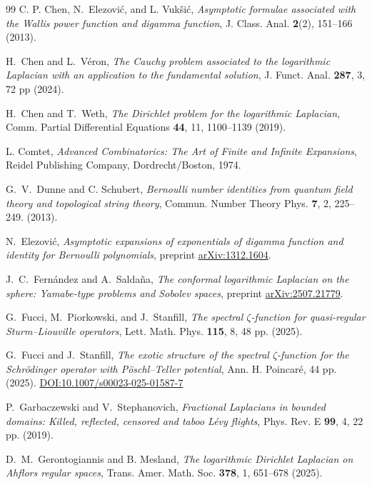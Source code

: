 \documentclass[letterpaper,10pt]{amsart}
\newcommand{\arxiv}[1]{\href{http://arxiv.org/abs/#1}{arXiv:#1}}
\newcommand{\doi}[1]{\href{http://dx.doi.org/#1}{DOI:#1}}
\numberwithin{equation}{section}
\begin{document}
\begin{thebibliography}{99}
 C. P. Chen, N.\ Elezovi\'{c}, and L. Vuk\v{s}i\'{c}, \textit{Asymptotic formulae associated with the Wallis power function and digamma function}, J. Class. Anal. \textbf{2}(2), 151--166 (2013).

 H.\ Chen and L.\ Véron, \textit{The Cauchy problem associated to the logarithmic Laplacian with an application to the fundamental solution}, J. Funct. Anal. {\bf 287}, 3, 72 pp (2024).

 H.\ Chen and T.\ Weth, \textit{The Dirichlet problem for the logarithmic Laplacian}, Comm. Partial Differential Equations {\bf 44}, 11,  1100--1139 (2019).

 L. Comtet, \textit{Advanced Combinatorics: The Art of Finite and Infinite Expansions}, Reidel Publishing Company, Dordrecht/Boston, 1974.

 G.\ V.\ Dunne and C. Schubert, \textit{Bernoulli number identities from quantum field theory and topological string theory}, Commun. Number Theory Phys. {\bf 7}, 2, 225--249. (2013). 

 N.\ Elezovi\'{c}, \textit{Asymptotic expansions of exponentials of digamma function and identity for Bernoulli polynomials}, preprint \arxiv{1312.1604}.

 J.\ C.\ Fernández and A.\ Saldaña, {\it The conformal logarithmic Laplacian on the sphere:
Yamabe-type problems and Sobolev spaces}, preprint \arxiv{2507.21779}.

 G.\ Fucci,  M.\ Piorkowski, and J.\ Stanfill, {\it The spectral $\zeta$-function for quasi-regular Sturm--Liouville operators}, Lett. Math. Phys. {\bf 115}, 8, 48 pp. (2025).

 G.\ Fucci and J.\ Stanfill, \textit{The exotic structure of the spectral $\zeta$-function for the Schr\"odinger operator with P\"oschl--Teller potential}, Ann. H. Poincar\'e, 44 pp. (2025). \doi{10.1007/s00023-025-01587-7}

 P.\ Garbaczewski and V.\ Stephanovich, \textit{Fractional Laplacians in bounded domains: Killed, reflected, censored and taboo Lévy
flights}, Phys. Rev. E {\bf 99}, 4, 22 pp. (2019).

 D.\ M.\ Gerontogiannis and B. Mesland, \textit{The logarithmic Dirichlet Laplacian on Ahflors regular spaces}, Trans. Amer. Math. Soc. {\bf 378}, 1, 651--678 (2025).


\end{thebibliography}
\end{document}

